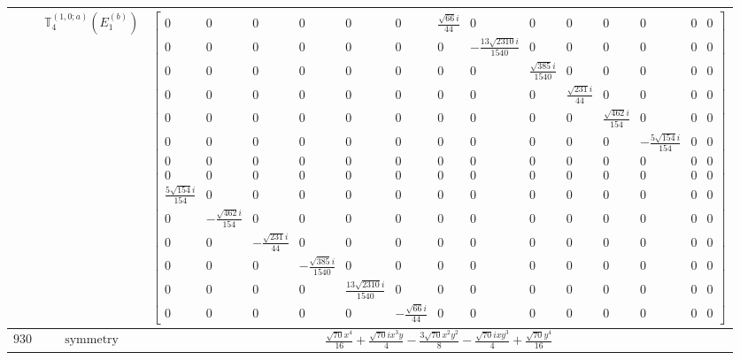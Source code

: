 \documentclass[fleqn,8pt,landscape]{jsarticle}
\begin{document}
\begin{longtable}{ccc}
$  $ & $ \mathbb{T}_{4}^{(1,0;a)}(E_{1}^{(b)}) $ & $ \begin{bmatrix} 0 & 0 & 0 & 0 & 0 & 0 & \frac{\sqrt{66} i}{44} & 0 & 0 & 0 & 0 & 0 & 0 & 0 \\ 0 & 0 & 0 & 0 & 0 & 0 & 0 & - \frac{13 \sqrt{2310} i}{1540} & 0 & 0 & 0 & 0 & 0 & 0 \\ 0 & 0 & 0 & 0 & 0 & 0 & 0 & 0 & \frac{\sqrt{385} i}{1540} & 0 & 0 & 0 & 0 & 0 \\ 0 & 0 & 0 & 0 & 0 & 0 & 0 & 0 & 0 & \frac{\sqrt{231} i}{44} & 0 & 0 & 0 & 0 \\ 0 & 0 & 0 & 0 & 0 & 0 & 0 & 0 & 0 & 0 & \frac{\sqrt{462} i}{154} & 0 & 0 & 0 \\ 0 & 0 & 0 & 0 & 0 & 0 & 0 & 0 & 0 & 0 & 0 & - \frac{5 \sqrt{154} i}{154} & 0 & 0 \\ 0 & 0 & 0 & 0 & 0 & 0 & 0 & 0 & 0 & 0 & 0 & 0 & 0 & 0 \\ 0 & 0 & 0 & 0 & 0 & 0 & 0 & 0 & 0 & 0 & 0 & 0 & 0 & 0 \\ \frac{5 \sqrt{154} i}{154} & 0 & 0 & 0 & 0 & 0 & 0 & 0 & 0 & 0 & 0 & 0 & 0 & 0 \\ 0 & - \frac{\sqrt{462} i}{154} & 0 & 0 & 0 & 0 & 0 & 0 & 0 & 0 & 0 & 0 & 0 & 0 \\ 0 & 0 & - \frac{\sqrt{231} i}{44} & 0 & 0 & 0 & 0 & 0 & 0 & 0 & 0 & 0 & 0 & 0 \\ 0 & 0 & 0 & - \frac{\sqrt{385} i}{1540} & 0 & 0 & 0 & 0 & 0 & 0 & 0 & 0 & 0 & 0 \\ 0 & 0 & 0 & 0 & \frac{13 \sqrt{2310} i}{1540} & 0 & 0 & 0 & 0 & 0 & 0 & 0 & 0 & 0 \\ 0 & 0 & 0 & 0 & 0 & - \frac{\sqrt{66} i}{44} & 0 & 0 & 0 & 0 & 0 & 0 & 0 & 0 \end{bmatrix} $ \\ \hline
$ 930 $ & $ \text{symmetry} $ & $ \frac{\sqrt{70} x^{4}}{16} + \frac{\sqrt{70} i x^{3} y}{4} - \frac{3 \sqrt{70} x^{2} y^{2}}{8} - \frac{\sqrt{70} i x y^{3}}{4} + \frac{\sqrt{70} y^{4}}{16} $ \\

\end{longtable}
\end{document}

